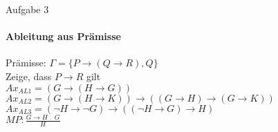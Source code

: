 \begin{frame}{Aufgabe 3}
	\framesubtitle{Ableitung aus Prämisse}
	Prämisse: $\Gamma =\{P\rightarrow(Q\rightarrow R), Q\}$\\
	Zeige, dass $P\rightarrow R$ gilt\\
	$Ax_{AL1} = (G\rightarrow(H\rightarrow G))$\\
	$Ax_{AL2} = (G\rightarrow(H\rightarrow K))\rightarrow((G\rightarrow H)\rightarrow(G\rightarrow K))$\\
	$Ax_{AL3} = (\neg H\rightarrow\neg G)\rightarrow((\neg H\rightarrow G)\rightarrow H)$\\
	$MP : \frac{G\rightarrow H\quad G}{H}$\\
\end{frame}
